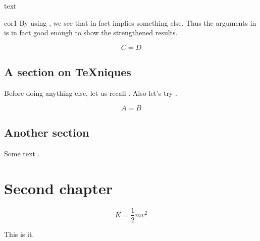 \documentclass[noocg]{wwwnotes2}
\begin{document}
\begin{cor}
	\lipsum[24]

	text
\end{cor}

\begin{pfof}{cor1}
	By using , we see that  in fact implies something else. Thus the arguments in  is in fact good enough to show the strengthened results. 
\end{pfof}

\begin{equation}
	C = D
\end{equation}

\section{A section on \TeX{}niques}

Before doing anything else, let us recall . Also let's try .

\lipsum[2]

\begin{equation}
	A = B
\end{equation}

\lipsum[3-8]



\section{Another section}

\lipsum[5-9]

Some text \cite{Wong2009}.


\chapter{Second chapter}


\lipsum[10-23]

\begin{equation}
K = \frac12 mv^2
\end{equation}

This is it.


\cleardoublepage
\end{document}
